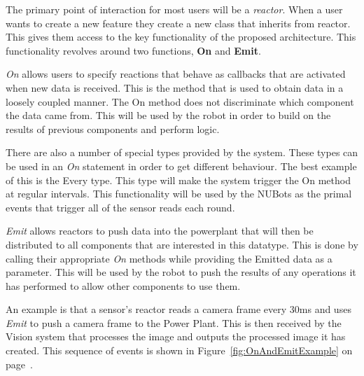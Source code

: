 \documentclass[english,12pt]{scrartcl}
\begin{document}
			The primary point of interaction for most users will be a \emph{\gls{reactor}}.
			When a user wants to create a new feature they create a new class that inherits from \gls{reactor}.
			This gives them access to the key functionality of the proposed architecture. This functionality revolves around two functions, \textbf{On} and \textbf{Emit}.

			\emph{On} allows users to specify \glspl{reaction} that behave as callbacks that are activated when new data is received.
			This is the method that is used to obtain data in a loosely coupled manner.
			The On method does not discriminate which component the data came from.
			This will be used by the robot in order to build on the results of previous components and perform logic.

			There are also a number of special types provided by the system.
			These types can be used in an \emph{On} statement in order to get different behaviour.
			The best example of this is the Every type. This type will make the system trigger the On method at regular intervals.
			This functionality will be used by the NUBots as the primal events that trigger all of the sensor reads each round.

			\emph{Emit} allows \glspl{reactor} to push data into the \gls{powerplant} that will then be distributed to all components that are interested in this datatype. This is done by calling their appropriate \emph{On} methods while providing the Emitted data as a parameter.
			This will be used by the robot to push the results of any operations it has performed to allow other components to use them.

			An example is that a sensor's reactor reads a camera frame every 30ms and uses \emph{Emit} to push a camera frame to the Power Plant. This is then received by the Vision system that processes the image and outputs the processed image it has created. This sequence of events is shown in Figure~\ref{fig:OnAndEmitExample} on page~\pageref{fig:OnAndEmitExample}.
\end{document}
